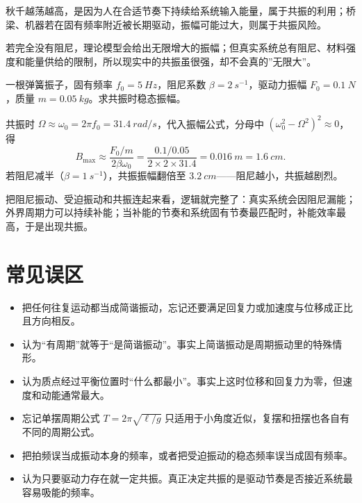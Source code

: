 \documentclass[lang=cn,11pt]{elegantbook}
\begin{document}
\begin{example}[共振为什么既有利又有风险]
秋千越荡越高，是因为人在合适节奏下持续给系统输入能量，属于共振的利用；桥梁、机器若在固有频率附近被长期驱动，振幅可能过大，则属于共振风险。
\end{example}

\begin{note}
若完全没有阻尼，理论模型会给出无限增大的振幅；但真实系统总有阻尼、材料强度和能量供给的限制，所以现实中的共振虽很强，却不会真的”无限大”。
\end{note}

\begin{example}
一根弹簧振子，固有频率 \(f_0=\SI{5}{Hz}\)，阻尼系数 \(\beta=\SI{2}{s^{-1}}\)，驱动力振幅 \(F_0=\SI{0.1}{N}\)，质量 \(m=\SI{0.05}{kg}\)。求共振时稳态振幅。
\end{example}
\begin{solution}
共振时 \(\Omega\approx\omega_0=2\pi f_0=\SI{31.4}{rad/s}\)，代入振幅公式，分母中 \((\omega_0^2-\Omega^2)^2\approx0\)，得
\[
B_{\max}\approx\frac{F_0/m}{2\beta\omega_0}=\frac{0.1/0.05}{2\times2\times31.4}=\SI{0.016}{m}=\SI{1.6}{cm}.
\]
若阻尼减半（\(\beta=\SI{1}{s^{-1}}\)），共振振幅翻倍至 \(\SI{3.2}{cm}\)——阻尼越小，共振越剧烈。
\end{solution}

\begin{remark}
把阻尼振动、受迫振动和共振连起来看，逻辑就完整了：真实系统会因阻尼漏能；外界周期力可以持续补能；当补能的节奏和系统固有节奏最匹配时，补能效率最高，于是出现共振。
\end{remark}

\section{常见误区}

\begin{itemize}
  \item 把任何往复运动都当成简谐振动，忘记还要满足回复力或加速度与位移成正比且方向相反。
  \item 认为“有周期”就等于“是简谐振动”。事实上简谐振动是周期振动里的特殊情形。
  \item 认为质点经过平衡位置时“什么都最小”。事实上这时位移和回复力为零，但速度和动能通常最大。
  \item 忘记单摆周期公式 \(T=2\pi\sqrt{\ell/g}\) 只适用于小角度近似，复摆和扭摆也各自有不同的周期公式。
  \item 把拍频误当成振动本身的频率，或者把受迫振动的稳态频率误当成固有频率。
  \item 认为只要驱动力存在就一定共振。真正决定共振的是驱动节奏是否接近系统最容易吸能的频率。
\end{itemize}
\end{document}
